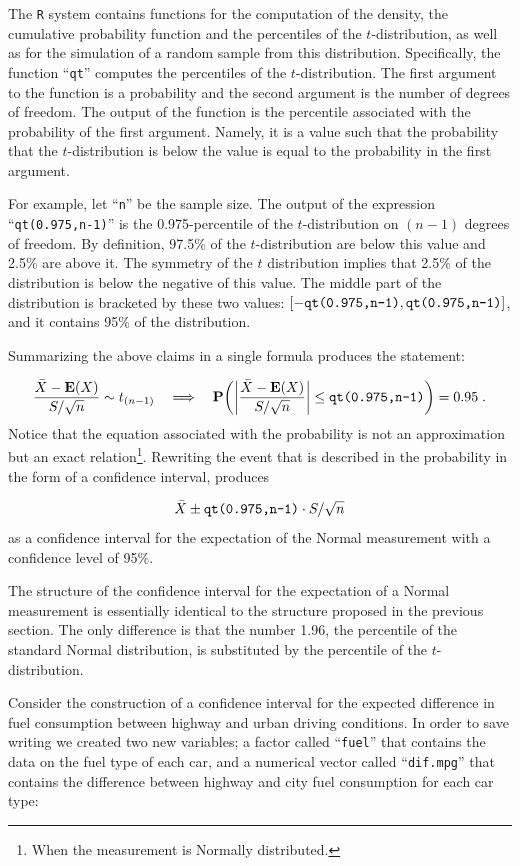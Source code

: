 \documentclass[]{krantz}
\newcommand{\Expec}{\mathbf{E}}
\newcommand{\Prob}{\mathbf{P}}
\theoremstyle{definition}
\theoremstyle{definition}
\theoremstyle{definition}
\theoremstyle{remark}
\begin{document}
The \texttt{R} system contains functions for the computation of the density,
the cumulative probability function and the percentiles of the
\(t\)-distribution, as well as for the simulation of a random sample from
this distribution. Specifically, the function ``\texttt{qt}'' computes the
percentiles of the \(t\)-distribution. The first argument to the function
is a probability and the second argument is the number of degrees of
freedom. The output of the function is the percentile associated with
the probability of the first argument. Namely, it is a value such that
the probability that the \(t\)-distribution is below the value is equal to
the probability in the first argument.

For example, let ``\texttt{n}'' be the sample size. The output of the expression
``\texttt{qt(0.975,n-1)}'' is the 0.975-percentile of the \(t\)-distribution on
\((n-1)\) degrees of freedom. By definition, 97.5\% of the \(t\)-distribution
are below this value and 2.5\% are above it. The symmetry of the \(t\)
distribution implies that 2.5\% of the distribution is below the negative
of this value. The middle part of the distribution is bracketed by these
two values:
\([-\mbox{\texttt{qt(0.975,n-1)}}, \mbox{\texttt{qt(0.975,n-1)}}]\), and
it contains 95\% of the distribution.

Summarizing the above claims in a single formula produces the statement:

\[\frac{\bar X - \Expec(X)}{S/\sqrt{n}} \sim t_{(n-1)} \quad \Longrightarrow \quad \Prob \bigg(\bigg|\frac{\bar X - \Expec(X)}{S/\sqrt{n}}\bigg| \leq \mbox{\texttt{qt(0.975,n-1)}} \bigg) = 0.95\;.\]
Notice that the equation associated with the probability is not an
approximation but an exact relation\footnote{When the measurement is Normally distributed.}. Rewriting the event that is
described in the probability in the form of a confidence interval,
produces

\[\bar X \pm \mbox{\texttt{qt(0.975,n-1)}}\cdot S/ \sqrt{n}\]
as a confidence interval for the expectation of the Normal measurement
with a confidence level of 95\%.

The structure of the confidence interval for the expectation of a Normal
measurement is essentially identical to the structure proposed in the
previous section. The only difference is that the number 1.96, the
percentile of the standard Normal distribution, is substituted by the
percentile of the \(t\)-distribution.

Consider the construction of a confidence interval for the expected
difference in fuel consumption between highway and urban driving
conditions. In order to save writing we created two new variables; a
factor called ``\texttt{fuel}'' that contains the data on the fuel type of each
car, and a numerical vector called ``\texttt{dif.mpg}'' that contains the
difference between highway and city fuel consumption for each car type:
\end{document}
